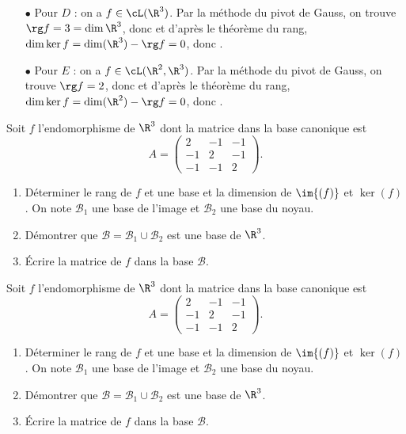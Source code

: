 \documentclass[a4paper, 11pt,reqno]{article}
\begin{document}
\begin{correction}
\begin{itemize}
		\item[$\bullet$] Pour $D$ : on a $f \in \cL(\R^3)$. Par la m\'ethode du pivot de Gauss, on trouve $\rg f=3=\dim \R^3$, donc  et d'apr\`es le th\'eor\`eme du rang, $\dim \ker f = \dim(\R^3) - \rg f = 0$, donc .
		\item[$\bullet$] Pour $E$ : on a $f \in \cL(\R^2, \R^3)$. Par la m\'ethode du pivot de Gauss, on trouve $\rg f=2$, donc  et d'apr\`es le th\'eor\`eme du rang, $\dim \ker f = \dim(\R^2) - \rg f = 0$, donc .
	\end{itemize}
\end{correction}
\begin{exercice}
Soit $f$ l'endomorphisme de $\R^3$ dont la matrice dans la base canonique est
$$A=\left(\begin{array}{ccc} 2&-1&-1\\-1&2&-1\\-1&-1&2    \end{array}\right).$$
\begin{enumerate}
\item D\'eterminer le rang de $f$ et une base et la dimension de $\im{(f)}$ et $\ker{(f)}$. On note $\mathcal{B}_1$ une base de l'image et $\mathcal{B}_2$ une base du noyau.
\item D\'emontrer que $\mathcal{B}=\mathcal{B}_1\cup\mathcal{B}_2$ est une base de $\R^3$.
\item \'Ecrire la matrice de $f$ dans la base $\mathcal{B}$.
\end{enumerate}
\end{exercice}
\begin{correction}
Soit $f$ l'endomorphisme de $\R^3$ dont la matrice dans la base canonique est
$$A=\left(\begin{array}{ccc} 2&-1&-1\\-1&2&-1\\-1&-1&2    \end{array}\right).$$
\begin{enumerate}
\item D\'eterminer le rang de $f$ et une base et la dimension de $\im{(f)}$ et $\ker{(f)}$. On note $\mathcal{B}_1$ une base de l'image et $\mathcal{B}_2$ une base du noyau.
\item D\'emontrer que $\mathcal{B}=\mathcal{B}_1\cup\mathcal{B}_2$ est une base de $\R^3$.
\item \'Ecrire la matrice de $f$ dans la base $\mathcal{B}$.
\end{enumerate}
\end{correction}
\end{document}
